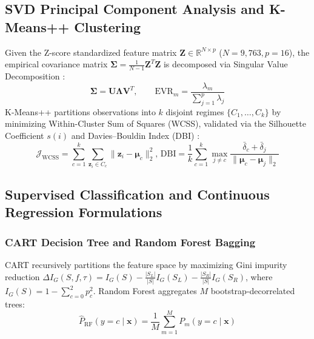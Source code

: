 \documentclass[conference]{IEEEtran}
\begin{document}
\subsection{SVD Principal Component Analysis and K-Means++ Clustering}
Given the Z-score standardized feature matrix $\mathbf{Z} \in \mathbb{R}^{N \times p}$ ($N = 9,763, p = 16$), the empirical covariance matrix $\mathbf{\Sigma} = \frac{1}{N-1}\mathbf{Z}^T\mathbf{Z}$ is decomposed via Singular Value Decomposition \cite{hotelling1933}:
\begin{equation}
\mathbf{\Sigma} = \mathbf{U} \mathbf{\Lambda} \mathbf{V}^T, \qquad \text{EVR}_m = \frac{\lambda_m}{\sum_{j=1}^{p} \lambda_j}
\label{eq:pca}
\end{equation}
K-Means++ \cite{macqueen1967} partitions observations into $k$ disjoint regimes $\{C_1, \dots, C_k\}$ by minimizing Within-Cluster Sum of Squares (WCSS), validated via the Silhouette Coefficient $s(i)$ \cite{rousseeuw1987} and Davies--Bouldin Index (DBI) \cite{davies1979}:
\begin{equation}
\mathcal{J}_{\text{WCSS}} = \sum_{c=1}^{k} \sum_{\mathbf{z}_i \in C_c} \|\mathbf{z}_i - \boldsymbol{\mu}_c\|_2^2, \, \text{DBI} = \frac{1}{k}\!\sum_{c=1}^{k} \max_{j \neq c} \frac{\bar{\delta}_c + \bar{\delta}_j}{\|\boldsymbol{\mu}_c - \boldsymbol{\mu}_j\|_2}
\label{eq:kmeans}
\end{equation}

\subsection{Supervised Classification and Continuous Regression Formulations}
\subsubsection{CART Decision Tree and Random Forest Bagging}
CART recursively partitions the feature space by maximizing Gini impurity reduction $\Delta I_G(S, f, \tau) = I_G(S) - \frac{|S_L|}{|S|}I_G(S_L) - \frac{|S_R|}{|S|}I_G(S_R)$, where $I_G(S) = 1 - \sum_{c=0}^{2} p_c^2$. Random Forest \cite{breiman2001} aggregates $M$ bootstrap-decorrelated trees:
\begin{equation}
\hat{P}_{\text{RF}}(y = c \mid \mathbf{x}) = \frac{1}{M} \sum_{m=1}^{M} P_m(y = c \mid \mathbf{x})
\label{eq:rf}
\end{equation}
\end{document}
